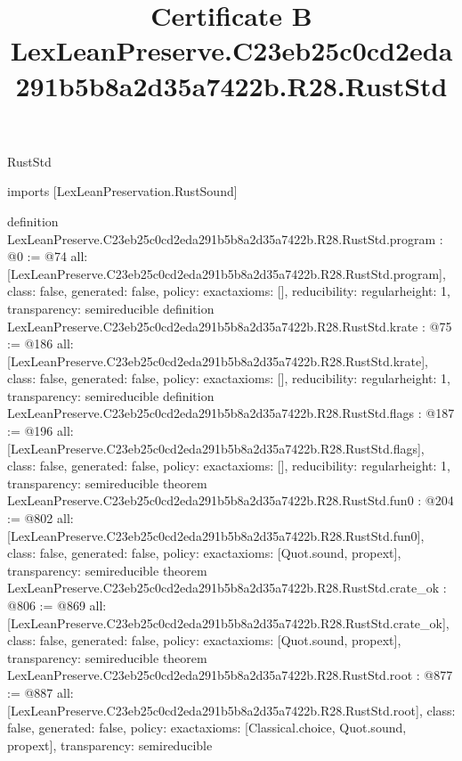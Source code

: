 \begin{lexlean}{RustStd}
\title{Certificate B LexLeanPreserve.C23eb25c0cd2eda291b5b8a2d35a7422b.R28.RustStd}
\begin{coremodule}
imports [LexLeanPreservation.RustSound]

definition LexLeanPreserve.C23eb25c0cd2eda291b5b8a2d35a7422b.R28.RustStd.program : @0 := @74 {
  all: [LexLeanPreserve.C23eb25c0cd2eda291b5b8a2d35a7422b.R28.RustStd.program],
  class: false,
  generated: false,
  policy: exact{axioms: []},
  reducibility: regular{height: 1},
  transparency: semireducible
}
definition LexLeanPreserve.C23eb25c0cd2eda291b5b8a2d35a7422b.R28.RustStd.krate : @75 := @186 {
  all: [LexLeanPreserve.C23eb25c0cd2eda291b5b8a2d35a7422b.R28.RustStd.krate],
  class: false,
  generated: false,
  policy: exact{axioms: []},
  reducibility: regular{height: 1},
  transparency: semireducible
}
definition LexLeanPreserve.C23eb25c0cd2eda291b5b8a2d35a7422b.R28.RustStd.flags : @187 := @196 {
  all: [LexLeanPreserve.C23eb25c0cd2eda291b5b8a2d35a7422b.R28.RustStd.flags],
  class: false,
  generated: false,
  policy: exact{axioms: []},
  reducibility: regular{height: 1},
  transparency: semireducible
}
theorem LexLeanPreserve.C23eb25c0cd2eda291b5b8a2d35a7422b.R28.RustStd.fun0 : @204 := @802 {
  all: [LexLeanPreserve.C23eb25c0cd2eda291b5b8a2d35a7422b.R28.RustStd.fun0],
  class: false,
  generated: false,
  policy: exact{axioms: [Quot.sound, propext]},
  transparency: semireducible
}
theorem LexLeanPreserve.C23eb25c0cd2eda291b5b8a2d35a7422b.R28.RustStd.crate_ok : @806 := @869 {
  all: [LexLeanPreserve.C23eb25c0cd2eda291b5b8a2d35a7422b.R28.RustStd.crate_ok],
  class: false,
  generated: false,
  policy: exact{axioms: [Quot.sound, propext]},
  transparency: semireducible
}
theorem LexLeanPreserve.C23eb25c0cd2eda291b5b8a2d35a7422b.R28.RustStd.root : @877 := @887 {
  all: [LexLeanPreserve.C23eb25c0cd2eda291b5b8a2d35a7422b.R28.RustStd.root],
  class: false,
  generated: false,
  policy: exact{axioms: [Classical.choice, Quot.sound, propext]},
  transparency: semireducible
}


\end{coremodule}
\end{lexlean}
